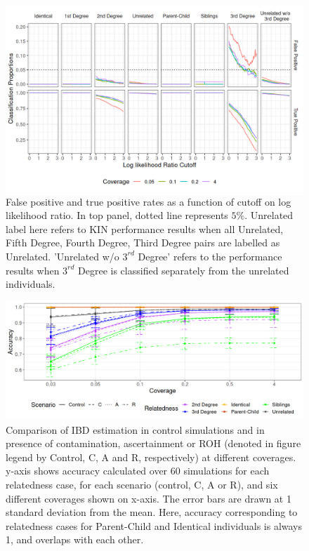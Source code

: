\documentclass[12pt, letterpaper]{article}
\begin{document}
\begin{figure}[h!]
    \includegraphics[width=16cm]{plots/plotimg/contam0_inbred0_model_performance_allroc_asc0_plot.png}
    \centering
    \caption{False positive and true positive rates as a function of cutoff on log likelihood ratio. In top panel, dotted line represents $5\%$. Unrelated label here refers to KIN performance results when all Unrelated, Fifth Degree, Fourth Degree, Third Degree pairs are labelled as Unrelated. 'Unrelated w/o $3^{rd}$ Degree' refers to the performance results when $3^{rd}$ Degree is classified separately from the unrelated individuals.}
    \label{figS10:cutoff}
\end{figure}

\begin{figure}[h!]
    \centering
    \includegraphics[width=18cm]{plots/plotimg/plot_IBDaccuracy_others_supp.png}
    \caption{Comparison of IBD estimation in control simulations and in presence of contamination, ascertainment or ROH (denoted in figure legend by Control, C, A and R, respectively) at different coverages. y-axis shows accuracy calculated over 60 simulations for each relatedness case, for each scenario (control, C, A or R), and six different coverages shown on x-axis. The error bars are drawn at 1 standard deviation from the mean. Here, accuracy corresponding to relatedness cases for Parent-Child and Identical individuals is always 1, and overlaps with each other.}
    \label{figS11:ibd_others}
\end{figure}
\end{document}
